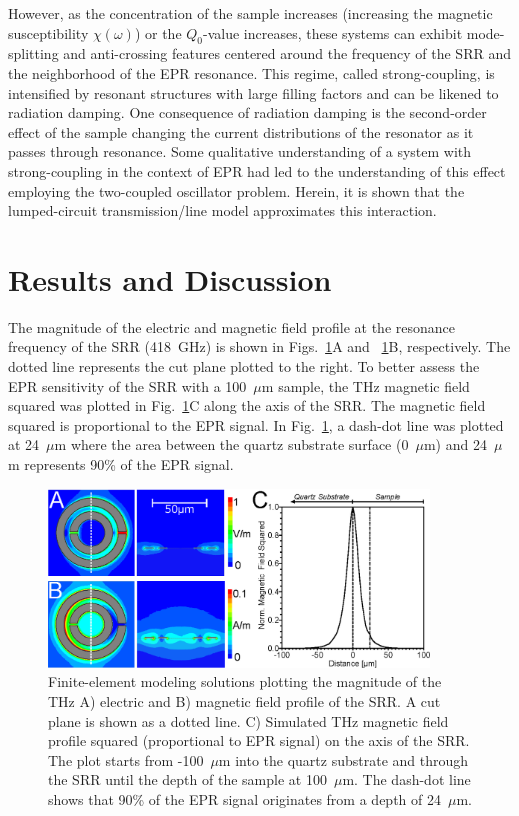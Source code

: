 However, as the concentration of the sample increases (increasing the magnetic susceptibility $\chi(\omega)$) or the $Q_0$-value increases, these systems can exhibit mode-splitting and anti-crossing features centered around the frequency of the SRR and the neighborhood of the EPR resonance. This regime, called strong-coupling, is intensified by resonant structures with large filling factors and can be likened to radiation damping. \cite{BloembergenRadDamp, BloomRadDamp, MeiboomRadDamp} One consequence of radiation damping is the second-order effect of the sample changing the current distributions of the resonator as it passes through resonance. Some qualitative understanding of a system with strong-coupling in the context of EPR had led to the understanding of this effect employing the two-coupled oscillator problem. \cite{SchneiderEPR,BOERO2013133,Scalari1323} Herein, it is shown that the lumped-circuit transmission\-/line model approximates this interaction. 

\section{Results and Discussion}
The magnitude of the electric and magnetic field profile at the resonance frequency of the SRR (418~GHz) is shown in Figs.~\ref{ch3-fig:HFSS}A and ~\ref{ch3-fig:HFSS}B, respectively. The dotted line represents the cut plane plotted to the right. To better assess the EPR sensitivity of the SRR with a 100~$\mu$m sample, the THz magnetic field squared was plotted in Fig.~\ref{ch3-fig:HFSS}C along the axis of the SRR. The magnetic field squared is proportional to the EPR signal. In Fig.~\ref{ch3-fig:HFSS}, a dash-dot line was plotted at 24~$\mu$m where the area between the quartz substrate surface (0~$\mu$m) and 24~$\mu$m represents 90\% of the EPR signal.

\begin{figure}[htp]
\centering
  \includegraphics[width=0.9\textwidth]{Kapitel/Ch3-Images/02-AnsoftFields.eps}%
  \caption[Finite-element simulation solutions of SRR geometry.]{Finite-element modeling solutions plotting the magnitude of the THz A) electric and B) magnetic field profile of the SRR. A cut plane is shown as a dotted line. C) Simulated THz magnetic field profile squared (proportional to EPR signal) on the axis of the SRR. The plot starts from -100~$\mu$m into the quartz substrate and through the SRR until the depth of the sample at 100~$\mu$m. The dash-dot line shows that 90\% of the EPR signal originates from a depth of 24~$\mu$m.}
  \label{ch3-fig:HFSS}
\end{figure}

